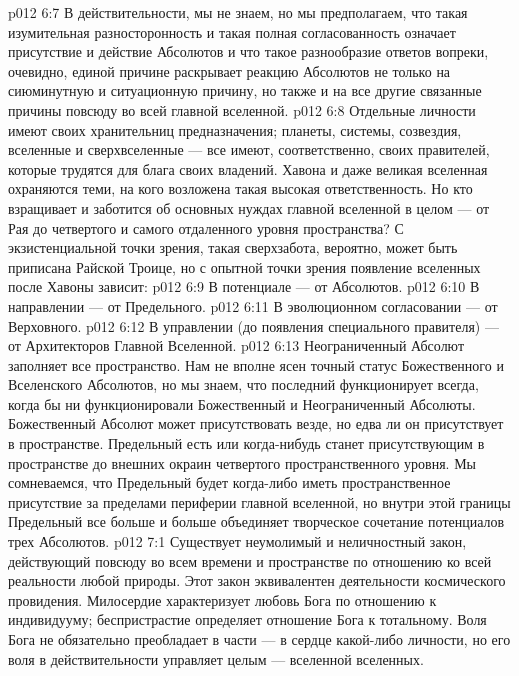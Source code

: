 \vs p012 6:7 В действительности, мы не знаем, но мы предполагаем, что такая изумительная разносторонность и такая полная согласованность означает присутствие и действие Абсолютов и что такое разнообразие ответов вопреки, очевидно, единой причине раскрывает реакцию Абсолютов не только на сиюминутную и ситуационную причину, но также и на все другие связанные причины повсюду во всей главной вселенной.
\vs p012 6:8 \pc Отдельные личности имеют своих хранительниц предназначения; планеты, системы, созвездия, вселенные и сверхвселенные --- все имеют, соответственно, своих правителей, которые трудятся для блага своих владений. Хавона и даже великая вселенная охраняются теми, на кого возложена такая высокая ответственность. Но кто взращивает и заботится об основных нуждах главной вселенной в целом --- от Рая до четвертого и самого отдаленного уровня пространства? С экзистенциальной точки зрения, такая сверхзабота, вероятно, может быть приписана Райской Троице, но с опытной точки зрения появление вселенных после Хавоны зависит:
\vs p012 6:9 \bibnobreakspace В потенциале --- от Абсолютов.
\vs p012 6:10 \bibnobreakspace В направлении --- от Предельного.
\vs p012 6:11 \bibnobreakspace В эволюционном согласовании --- от Верховного.
\vs p012 6:12 \bibnobreakspace В управлении (до появления специального правителя) --- от Архитекторов Главной Вселенной.
\vs p012 6:13 \pc Неограниченный Абсолют заполняет все пространство. Нам не вполне ясен точный статус Божественного и Вселенского Абсолютов, но мы знаем, что последний функционирует всегда, когда бы ни функционировали Божественный и Неограниченный Абсолюты. Божественный Абсолют может присутствовать везде, но едва ли он присутствует в пространстве. Предельный есть или когда\hyp{}нибудь станет присутствующим в пространстве до внешних окраин четвертого пространственного уровня. Мы сомневаемся, что Предельный будет когда\hyp{}либо иметь пространственное присутствие за пределами периферии главной вселенной, но внутри этой границы Предельный все больше и больше объединяет творческое сочетание потенциалов трех Абсолютов.
\vs p012 7:1 Существует неумолимый и неличностный закон, действующий повсюду во всем времени и пространстве по отношению ко всей реальности любой природы. Этот закон эквивалентен деятельности космического провидения. Милосердие характеризует любовь Бога по отношению к индивидууму; беспристрастие определяет отношение Бога к тотальному. Воля Бога не обязательно преобладает в части --- в сердце какой\hyp{}либо личности, но его воля в действительности управляет целым --- вселенной вселенных.
